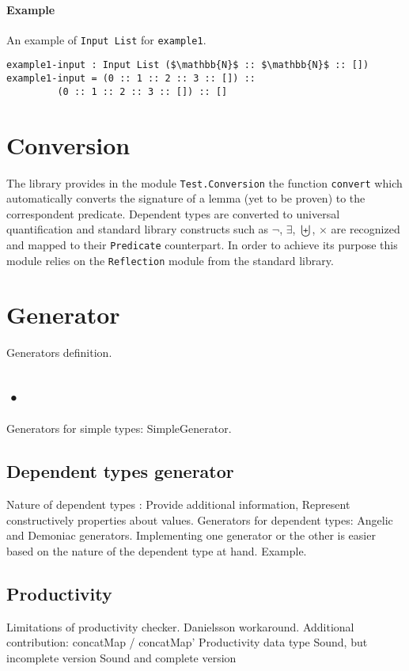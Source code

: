 \documentclass[10pt,a4paper]{article}
\begin{document}
\paragraph{Example} An example of \texttt{Input List} for \texttt{example1}.
\begin{lstlisting}
example1-input : Input List ($\mathbb{N}$ :: $\mathbb{N}$ :: [])
example1-input = (0 :: 1 :: 2 :: 3 :: []) :: 
		 (0 :: 1 :: 2 :: 3 :: []) :: []
\end{lstlisting}

\section{Conversion}
The library provides in the module \texttt{Test.Conversion} the function \texttt{convert} which automatically converts the signature of a lemma (yet to be proven) to the correspondent predicate. Dependent types are converted to universal quantification and standard library constructs such as $\neg$, $\exists$, $\biguplus$, $\times$ are recognized and mapped to their \texttt{Predicate} counterpart.
In order to achieve its purpose this module relies on the \texttt{Reflection} module from the standard library.

\section{Generator}
Generators definition.

\subsection{•}
Generators for simple types: SimpleGenerator.

\subsection{Dependent types generator}
Nature of dependent types : Provide additional information, Represent constructively properties about values.
Generators for dependent types: Angelic and Demoniac generators.
Implementing one generator or the other is easier based on the nature of the dependent type at hand.
Example.

\subsection{Productivity}
Limitations of productivity checker.
Danielsson workaround.
Additional contribution:
	concatMap / concatMap'
Productivity data type
	Sound, but incomplete version
	Sound and complete version
		
\end{document}
